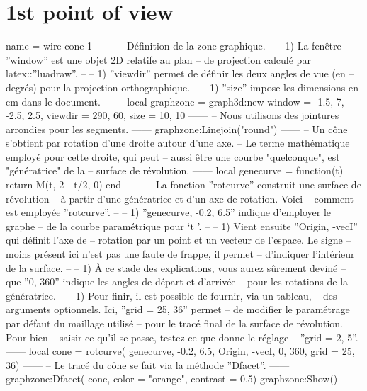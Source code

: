 \documentclass[varwidth, border = 3pt]{standalone}
\begin{document}
\section*{1st point of view}

\begin{luadraw}{name = wire-cone-1}
------
-- Définition de la zone graphique.
--
--     1) La fenêtre ''window'' est une objet 2D relatife au plan
--     de projection calculé par latex::''luadraw''.
--
--     1) ''viewdir'' permet de définir les deux angles de vue (en
--     degrés) pour la projection orthographique.
--
--     1) ''size'' impose les dimensions en cm dans le document.
------
    local graphzone = graph3d:new{
        window  = {-1.5, 7, -2.5, 2.5},
        viewdir = {290, 60},
        size    = {10, 10}
    }
------
-- Nous utilisons des jointures arrondies pour les segments.
------
    graphzone:Linejoin("round")
------
-- Un cône s'obtient par rotation d'une droite autour d'une axe.
-- Le terme mathématique employé pour cette droite, qui peut
-- aussi être une courbe "quelconque", est "génératrice" de la
-- surface de révolution.
------
    local genecurve = function(t)
        return M(t, 2 - t/2, 0)
    end
------
-- La fonction ''rotcurve'' construit une surface de révolution
-- à partir d'une génératrice et d'un axe de rotation. Voici
-- comment est employée ''rotcurve''.
--
--     1) ''genecurve, -0.2, 6.5'' indique d'employer le graphe
--     de la courbe paramétrique pour `t \in [-0.2 .. 6.5]'.
--
--     1) Vient ensuite ''{Origin, -vecI}'' qui définit l'axe de
--     rotation par un point et un vecteur de l'espace. Le signe
--     moins présent ici n'est pas une faute de frappe, il permet
--     d'indiquer l'intérieur de la surface.
--
--     1) À ce stade des explications, vous aurez sûrement deviné
--     que ''0, 360'' indique les angles de départ et d'arrivée
--     pour les rotations de la génératrice.
--
--     1) Pour finir, il est possible de fournir, via un tableau,
--     des arguments optionnels. Ici, ''grid = {25, 36}'' permet
--     de modifier le paramétrage par défaut du maillage utilisé
--     pour le tracé final de la surface de révolution. Pour bien
--     saisir ce qu'il se passe, testez ce que donne le réglage
--     ''grid = {2, 5}''.
------
    local cone = rotcurve(
        genecurve, -0.2, 6.5,
        {Origin, -vecI},
        0, 360,
        {grid = {25, 36}})
------
-- Le tracé du cône se fait via la méthode ''Dfacet''.
------
    graphzone:Dfacet(
   	    cone,
        {color    = "orange",
		 contrast = 0.5})
    graphzone:Show()
\end{luadraw}
\end{document}
